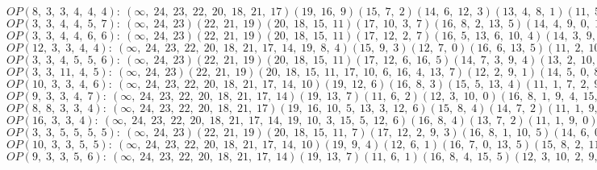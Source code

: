 $OP(8, \;3, \;3, \;4, \;4, \;4): \:(\infty, \;24, \;23, \;22, \;20, \;18, \;21, \;17)(19, \;16, \;9)(15, \;7, \;2)(14, \;6, \;12, \;3)(13, \;4, \;8, \;1)(11, \;5, \;10, \;0)$\\
$OP(3, \;3, \;4, \;4, \;5, \;7): \:(\infty, \;24, \;23)(22, \;21, \;19)(20, \;18, \;15, \;11)(17, \;10, \;3, \;7)(16, \;8, \;2, \;13, \;5)(14, \;4, \;9, \;0, \;12, \;6, \;1)$\\
$OP(3, \;3, \;4, \;4, \;6, \;6): \:(\infty, \;24, \;23)(22, \;21, \;19)(20, \;18, \;15, \;11)(17, \;12, \;2, \;7)(16, \;5, \;13, \;6, \;10, \;4)(14, \;3, \;9, \;0, \;8, \;1)$\\
$OP(12, \;3, \;3, \;4, \;4): \:(\infty, \;24, \;23, \;22, \;20, \;18, \;21, \;17, \;14, \;19, \;8, \;4)(15, \;9, \;3)(12, \;7, \;0)(16, \;6, \;13, \;5)(11, \;2, \;10, \;1)$\\
$OP(3, \;3, \;4, \;5, \;5, \;6): \:(\infty, \;24, \;23)(22, \;21, \;19)(20, \;18, \;15, \;11)(17, \;12, \;6, \;16, \;5)(14, \;7, \;3, \;9, \;4)(13, \;2, \;10, \;1, \;8, \;0)$\\
$OP(3, \;3, \;11, \;4, \;5): \:(\infty, \;24, \;23)(22, \;21, \;19)(20, \;18, \;15, \;11, \;17, \;10, \;6, \;16, \;4, \;13, \;7)(12, \;2, \;9, \;1)(14, \;5, \;0, \;8, \;3)$\\
$OP(10, \;3, \;3, \;4, \;6): \:(\infty, \;24, \;23, \;22, \;20, \;18, \;21, \;17, \;14, \;10)(19, \;12, \;6)(16, \;8, \;3)(15, \;5, \;13, \;4)(11, \;1, \;7, \;2, \;9, \;0)$\\
$OP(9, \;3, \;3, \;4, \;7): \:(\infty, \;24, \;23, \;22, \;20, \;18, \;21, \;17, \;14)(19, \;13, \;7)(11, \;6, \;2)(12, \;3, \;10, \;0)(16, \;8, \;1, \;9, \;4, \;15, \;5)$\\
$OP(8, \;8, \;3, \;3, \;4): \:(\infty, \;24, \;23, \;22, \;20, \;18, \;21, \;17)(19, \;16, \;10, \;5, \;13, \;3, \;12, \;6)(15, \;8, \;4)(14, \;7, \;2)(11, \;1, \;9, \;0)$\\
$OP(16, \;3, \;3, \;4): \:(\infty, \;24, \;23, \;22, \;20, \;18, \;21, \;17, \;14, \;19, \;10, \;3, \;15, \;5, \;12, \;6)(16, \;8, \;4)(13, \;7, \;2)(11, \;1, \;9, \;0)$\\
$OP(3, \;3, \;5, \;5, \;5, \;5): \:(\infty, \;24, \;23)(22, \;21, \;19)(20, \;18, \;15, \;11, \;7)(17, \;12, \;2, \;9, \;3)(16, \;8, \;1, \;10, \;5)(14, \;6, \;0, \;13, \;4)$\\
$OP(10, \;3, \;3, \;5, \;5): \:(\infty, \;24, \;23, \;22, \;20, \;18, \;21, \;17, \;14, \;10)(19, \;9, \;4)(12, \;6, \;1)(16, \;7, \;0, \;13, \;5)(15, \;8, \;2, \;11, \;3)$\\
$OP(9, \;3, \;3, \;5, \;6): \:(\infty, \;24, \;23, \;22, \;20, \;18, \;21, \;17, \;14)(19, \;13, \;7)(11, \;6, \;1)(16, \;8, \;4, \;15, \;5)(12, \;3, \;10, \;2, \;9, \;0)$\\
